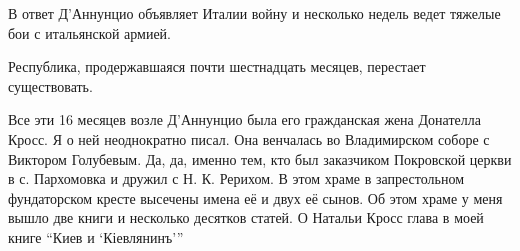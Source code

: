 В ответ Д'Аннунцио объявляет Италии войну и несколько недель ведет тяжелые бои
с итальянской армией.

Республика, продержавшаяся почти шестнадцать месяцев, перестает существовать.

Все эти 16 месяцев возле Д'Аннунцио была его гражданская жена Донателла Кросс.
Я о ней неоднократно писал. Она венчалась во Владимирском соборе с Виктором
Голубевым. Да, да, именно тем, кто был заказчиком Покровской церкви в с.
Пархомовка и дружил с Н. К. Рерихом. В этом храме в запрестольном фундаторском
кресте высечены имена её и двух её сынов. Об этом храме у меня вышло две книги
и несколько десятков статей. О Натальи Кросс глава в моей книге \enquote{Киев и
\enquote{Кіевлянинъ}}


